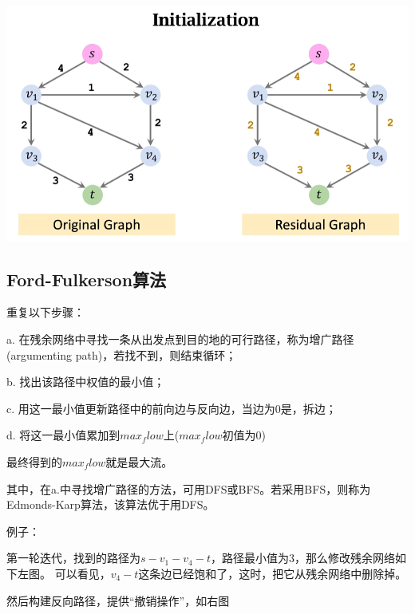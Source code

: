 \documentclass[a4paper]{article}    %
\begin{document}
\begin{center}
    \includegraphics[scale=0.5]{27.png}
\end{center}

\subsection{Ford-Fulkerson算法}

重复以下步骤：

a. 在残余网络中寻找一条从出发点到目的地的可行路径，称为增广路径(argumenting path)，若找不到，则结束循环；

b. 找出该路径中权值的最小值；

c. 用这一最小值更新路径中的前向边与反向边，当边为0是，拆边；

d. 将这一最小值累加到$max_flow$上($max_flow$初值为0)

最终得到的$max_flow$就是最大流。

其中，在a.中寻找增广路径的方法，可用DFS或BFS。若采用BFS，则称为Edmonds-Karp算法，该算法优于用DFS。

\noindent 例子：

第一轮迭代，找到的路径为$s-v_1-v_4-t$，路径最小值为3，那么修改残余网络如下左图。
可以看见，$v_4-t$这条边已经饱和了，这时，把它从残余网络中删除掉。

然后构建反向路径，提供“撤销操作”，如右图
\end{document}
